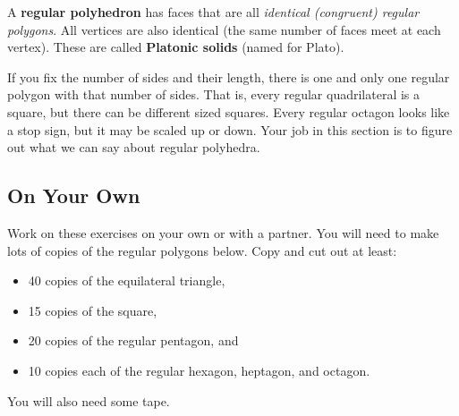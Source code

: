 \begin{define}
A {\bf regular polyhedron} has  faces that are all  \emph{identical (congruent) regular polygons}.  All vertices are also identical (the same number of faces meet at each vertex).  These are called {\bf Platonic solids} (named for Plato).
\end{define}

If you fix the number of sides and their length, there is one and only one regular polygon with that number of sides.  That is, every regular quadrilateral is a square, but there can be different sized squares.  Every regular octagon looks like a stop sign, but it may be scaled up or down.  Your job in this section is to figure out what we can say about regular polyhedra.


\subsection*{On Your Own}
Work on these exercises on your own or with a partner.  You will need to make lots of copies of the regular polygons below.  Copy and cut out at least:
\begin{itemize}
\item
40 copies of the equilateral triangle,
\item
15 copies of the square,
\item
20 copies of the regular pentagon, and
\item
10 copies each of the regular hexagon, heptagon, and octagon.
\end{itemize}
You will also need some tape.


